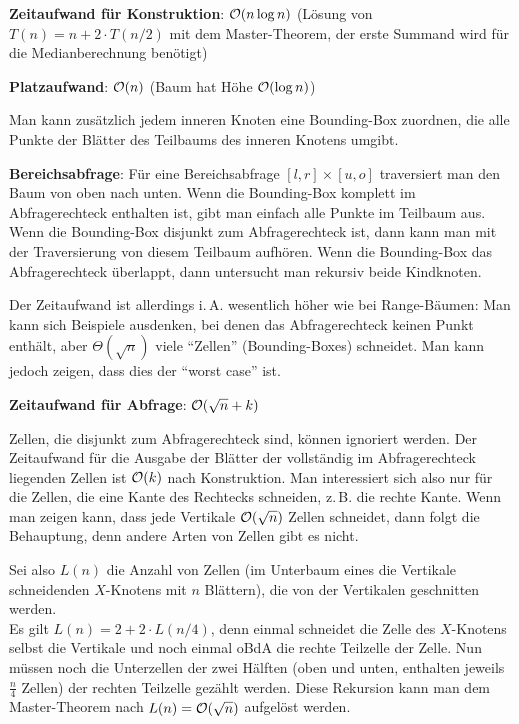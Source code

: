 \textbf{Zeitaufwand für Konstruktion}:
$\mathcal{O}(n \log n)$
(Lösung von $T(n) = n + 2 \cdot T(n/2)$ mit dem Master-Theorem, der erste Summand
wird für die Medianberechnung benötigt)

\textbf{Platzaufwand}:
$\mathcal{O}(n)$
(Baum hat Höhe $\mathcal{O}(\log n)$)

\linie

Man kann zusätzlich jedem inneren Knoten eine Bounding-Box zuordnen,
die alle Punkte der Blätter des Teilbaums des inneren Knotens umgibt.

\textbf{Bereichsabfrage}:
Für eine Bereichsabfrage $[l, r] \times [u, o]$ traversiert man den Baum von oben nach unten.
Wenn die Bounding-Box komplett im Abfragerechteck enthalten ist, gibt man einfach alle Punkte
im Teilbaum aus.
Wenn die Bounding-Box disjunkt zum Abfragerechteck ist, dann kann man mit der Traversierung
von diesem Teilbaum aufhören.
Wenn die Bounding-Box das Abfragerechteck überlappt, dann untersucht man rekursiv beide Kindknoten.

Der Zeitaufwand ist allerdings i.\,A. wesentlich höher wie bei Range-Bäumen:
Man kann sich Beispiele ausdenken, bei denen das Abfragerechteck keinen Punkt enthält,
aber $\Theta(\sqrt{n})$ viele "`Zellen"' (Bounding-Boxes) schneidet.
Man kann jedoch zeigen, dass dies der "`worst case"' ist.

\linie

\textbf{Zeitaufwand für Abfrage}:
$\mathcal{O}(\sqrt{n} + k)$

\begin{Beweis}
    Zellen, die disjunkt zum Abfragerechteck sind, können ignoriert werden.
    Der Zeitaufwand für die Ausgabe der Blätter der vollständig im Abfragerechteck liegenden Zellen
    ist $\mathcal{O}(k)$ nach Konstruktion.
    Man interessiert sich also nur für die Zellen, die eine Kante des Rechtecks schneiden,
    z.\,B. die rechte Kante.
    Wenn man zeigen kann, dass jede Vertikale $\mathcal{O}(\sqrt{n})$ Zellen schneidet, dann folgt die
    Behauptung, denn andere Arten von Zellen gibt es nicht.

    Sei also $L(n)$ die Anzahl von Zellen
    (im Unterbaum eines die Vertikale schneidenden $X$-Knotens mit $n$ Blättern),
    die von der Vertikalen geschnitten werden.\\
    Es gilt $L(n) = 2 + 2 \cdot L(n/4)$,
    denn einmal schneidet die Zelle des $X$-Knotens selbst die Vertikale und noch einmal oBdA
    die rechte Teilzelle der Zelle.
    Nun müssen noch die Unterzellen der zwei Hälften
    (oben und unten, enthalten jeweils $\frac{n}{4}$ Zellen)
    der rechten Teilzelle gezählt werden.
    Diese Rekursion kann man dem Master-Theorem nach $L(n) = \mathcal{O}(\sqrt{n})$ aufgelöst werden.
\end{Beweis}

